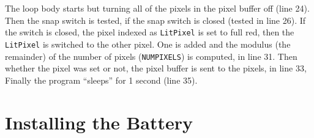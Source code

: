 \documentclass[letterpaper,twoside,12pt]{article}
\begin{document}
The loop body starts but turning all of the pixels in the pixel buffer off
(line 24). Then the snap switch is tested, if the snap switch is closed
(tested in line 26). If the switch is closed, the pixel indexed as
\texttt{LitPixel} is set to full red, then the \texttt{LitPixel} is switched
to the other pixel. One is added and the modulus (the remainder) of the number
of pixels (\texttt{NUMPIXELS}) is computed, in line 31. Then whether the
pixel was set or not, the pixel buffer is sent to the pixels, in line 33, 
Finally the program ``sleeps'' for 1 second (line 35).


\part{Installing the Battery}
\end{document}
